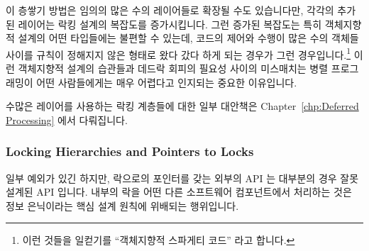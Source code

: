 이 층쌓기 방법은 임의의 많은 수의 레이어들로 확장될 수도 있습니다만, 각각의
추가된 레이어는 락킹 설계의 복잡도를 증가시킵니다.
그런 증가된 복잡도는 특히 객체지향적 설계의 어떤 타입들에는 불편할 수 있는데,
코드의 제어와 수행이 많은 수의 객체들 사이를 규칙이 정해지지 않은 형태로 왔다
갔다 하게 되는 경우가 그런 경우입니다.\footnote{
	이런 것들을 일컫기를 ``객체지향적 스파게티 코드'' 라고 합니다.}
이런 객체지향적 설계의 습관들과 데드락 회피의 필요성 사이의 미스매치는 병렬
프로그래밍이 어떤 사람들에게는 매우 어렵다고 인지되는 중요한 이유입니다.

수많은 레이어를 사용하는 락킹 계층들에 대한 일부 대안책은
Chapter~\ref{chp:Deferred Processing} 에서 다뤄집니다.

\subsubsection{Locking Hierarchies and Pointers to Locks}
\label{sec:locking:Locking Hierarchies and Pointers to Locks}

일부 예외가 있긴 하지만, 락으로의 포인터를 갖는 외부의 API 는 대부분의 경우
잘못 설계된 API 입니다.
내부의 락을 어떤 다른 소프트웨어 컴포넌트에서 처리하는 것은 정보 은닉이라는
핵심 설계 원칙에 위배되는 행위입니다.


